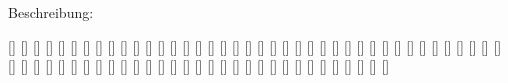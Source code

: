 \documentclass{m5figur-mv}[2016/01/04]
\begin{document}
{\begin{minipage}{\Halbseitenbreite}%
Beschreibung:
\end{minipage}
\begin{minipage}{\Halbseitenbreite}%
\end{minipage}%
\clearpage




}%


{%


\UngelerntOhne


[]{}
[]{}
[]{}
[]{}
[]{}
[]{}
[]{}
[]{}
[]{}
[]{}
[]{}
[]{}
[]{}
[]{}
[]{}
[]{}
[]{}
[]{}
[]{}
[]{}
[]{}
[]{}
[]{}
[]{}
[]{}
[]{}
[]{}
[]{}
[]{}
[]{}
[]{}
[]{}
[]{}
[]{}
[]{}
[]{}
[]{}
[]{}
[]{}
[]{}
[]{}
[]{}
[]{}
[]{}
[]{}
[]{}
[]{}
[]{}
[]{}
[]{}
[]{}
[]{}
[]{}
[]{}
[]{}
[]{}
[]{}
[]{}
[]{}
[]{}
[]{}
[]{}
[]{}
[]{}
[]{}
[]{}
[]{}
[]{}
[]{}
[]{}
[]{}

}
\end{document}
